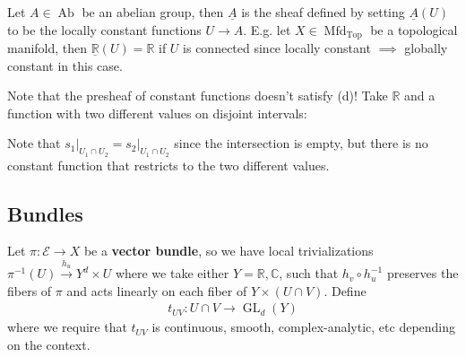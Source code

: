 \begin{example}

Let \(A\in {\operatorname{Ab}}\) be an abelian group, then
\(\underline{A}\) is the sheaf defined by setting \(\underline{A}(U)\)
to be the locally constant functions \(U\to A\). E.g. let
\(X \in {\operatorname{Mfd}}_{{\operatorname{Top}}}\) be a topological
manifold, then \(\underline{{\mathbb{R}}}(U) = {\mathbb{R}}\) if \(U\)
is connected since locally constant \(\implies\) globally constant in
this case.

\end{example}

\begin{warnings}

Note that the presheaf of constant functions doesn't satisfy (d)! Take
\({\mathbb{R}}\) and a function with two different values on disjoint
intervals:

\begin{figure}
\centering
{}
\end{figure}

Note that
\({ \left.{{s_1}} \right|_{{U_1 \cap U_2}} } = { \left.{{s_2}} \right|_{{U_1 \cap U_2}} }\)
since the intersection is empty, but there is no constant function that
restricts to the two different values.

\end{warnings}

\hypertarget{bundles}{%
\subsection{Bundles}\label{bundles}}

\begin{remark}

Let \(\pi: \mathcal{E}\to X\) be a \textbf{vector bundle}, so we have
local trivializations \(\pi ^{-1} (U) \xrightarrow{h_u} Y^d \times U\)
where we take either \(Y={\mathbb{R}}, {\mathbb{C}}\), such that
\(h_v \circ h_u ^{-1}\) preserves the fibers of \(\pi\) and acts
linearly on each fiber of \(Y\times(U \cap V)\). Define
\begin{align*}
t_{UV}: U \cap V \to \operatorname{GL}_d(Y)
\end{align*}
where we require that \(t_{UV}\) is continuous, smooth,
complex-analytic, etc depending on the context.

\begin{figure}
\centering
{}
\end{figure}

\end{remark}

